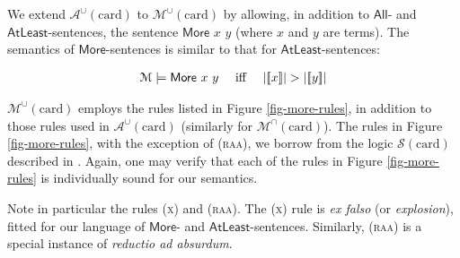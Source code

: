 \documentclass[letterpaper]{article} %
\theoremstyle{definition}
\newcommand{\semantics}[1]{[\![\mbox{\em $ #1 $\/}]\!]}
\newcommand{\Model}{\mathcal{M}}
\newcommand{\proves}{\vdash}
\newcommand{\rem}[1]{\relax}
\newcommand{\Aunion}{\mathscr{A}^{\cup}}
\newcommand{\Munion}{\mathscr{M}^{\cup}}
\newcommand{\Minter}{\mathscr{M}^{\cap}}
\newcommand{\proverule}{\textsc}
\newcommand{\x}{\proverule{x}}
\newcommand{\raa}{\proverule{raa}}
\newcommand{\Atleast}[2]{\mathsf{AtLeast}\,\,#1\,\,#2}
\newcommand{\More}[2]{\mathsf{More}\,\,#1\,\,#2}
\newcommand{\AllNoArgs}{\mathsf{All}}
\newcommand{\AtleastNoArgs}{\mathsf{AtLeast}}
\newcommand{\MoreNoArgs}{\mathsf{More}}
\newcommand{\card}{\mathrm{card}}
\newcommand{\noproof}{\rem}
\begin{document}
\noproof{\subsection{The Logics $\Munion(\card)$ and $\Minter(\card)$}}

We extend $\Aunion(\card)$ to $\Munion(\card)$ by allowing, in addition to $\AllNoArgs$- and $\AtleastNoArgs$-sentences, the sentence $\More{x}{y}$ (where $x$ and $y$ are terms).  The semantics of $\MoreNoArgs$-sentences is similar to that for $\AtleastNoArgs$-sentences:

\[
\begin{array}{lclcl}
    \Model \models \More{x}{y} & \textrm{ iff } & 
        |\semantics{x}| > |\semantics{y}|
\end{array}
\] 



$\Munion(\card)$ employs the rules listed in Figure \ref{fig-more-rules}, in addition to those rules used in $\Aunion(\card)$ (similarly for $\Minter(\card)$).  The rules in Figure \ref{fig-more-rules}, with the exception of (\raa), we borrow from the logic $\mathscr{S}(\card)$ described in \cite{syllogistic_cardinality_comparisons}.  Again, one may verify that each of the rules in Figure \ref{fig-more-rules} is individually sound for our semantics.

Note in particular the rules (\x) and (\raa).  The (\x) rule is \emph{ex falso} (or \emph{explosion}), fitted for our language of $\MoreNoArgs$- and $\AtleastNoArgs$-sentences.  Similarly, (\raa) is a special instance of \emph{reductio ad absurdum}.

\noproof{
With $\MoreNoArgs$-sentences in our language, we must now worry about expressing inconsistencies within our logics.  We say that a set $\Gamma$ of sentences in $\Munion(\card)$ (or $\Minter(\card)$) is \emph{inconsistent} whenever every sentence $\varphi$ in the logic is provable from $\Gamma$ (otherwise, we say that $\Gamma$ is \emph{consistent}).  Note that for these particular logics, using rule (\x), $\Gamma$ is inconsistent if and only if there is a term $z$ such that $\Gamma \proves \More{x}{y}$ and $\Gamma \proves \Atleast{y}{x}$.
}

\noproof{\subsection{Completeness}}
\end{document}
